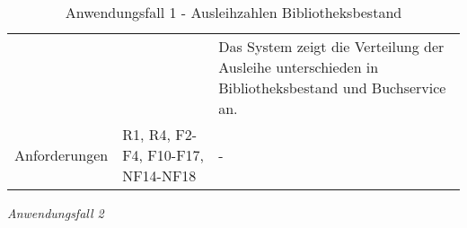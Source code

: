 \begin{table}[h]
\begin{adjustbox}{max width=\textwidth}
\begin{tabular}{lp{7.5cm}p{7.5cm}}
                                         & &Das System zeigt die Verteilung der Ausleihe unterschieden in Bibliotheksbestand und Buchservice an.\\

        Anforderungen                   &R1, R4, F2-F4, F10-F17, NF14-NF18& -\\ 
        \bottomrule
    \end{tabular}
    \end{adjustbox}
    \caption{%
    Anwendungsfall 1 - Ausleihzahlen Bibliotheksbestand
    }
    \label{tab:AF_Bibliotheksbestand}
    \end{table}

\endgroup


\newpage
\noindent
\textit{Anwendungsfall 2}


